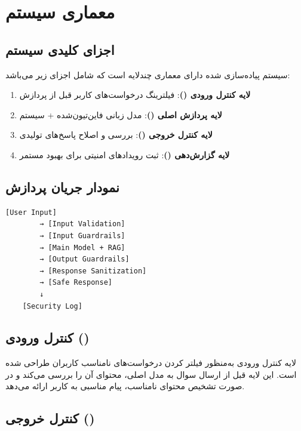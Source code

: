 \documentclass[11pt, a4paper, oneside]{book}
\begin{document}
	\section{معماری سیستم }

	\subsection{اجزای کلیدی سیستم}

	سیستم  پیاده‌سازی شده دارای معماری چندلایه است که شامل اجزای زیر می‌باشد:

	\begin{enumerate}
		\item \textbf{لایه کنترل ورودی ()}: فیلترینگ درخواست‌های کاربر قبل از پردازش
		\item \textbf{لایه پردازش اصلی ()}: مدل زبانی فاین‌تیون‌شده + سیستم 
		\item \textbf{لایه کنترل خروجی ()}: بررسی و اصلاح پاسخ‌های تولیدی
		\item \textbf{لایه گزارش‌دهی ()}: ثبت رویدادهای امنیتی برای بهبود مستمر
	\end{enumerate}

	\subsection{نمودار جریان پردازش}

	\begin{latin}
	\begin{lstlisting}[caption={\rl{معماری سیستم کنترل امنیتی}}]
	[User Input] 
		→ [Input Validation] 
		→ [Input Guardrails] 
		→ [Main Model + RAG] 
		→ [Output Guardrails] 
		→ [Response Sanitization]
		→ [Safe Response]
		↓
	[Security Log]
	\end{lstlisting}
	\end{latin}

	\subsection{کنترل ورودی ()}

	لایه کنترل ورودی به‌منظور فیلتر کردن درخواست‌های نامناسب کاربران طراحی شده است. این لایه قبل از ارسال سوال به مدل اصلی، محتوای آن را بررسی می‌کند و در صورت تشخیص محتوای نامناسب، پیام مناسبی به کاربر ارائه می‌دهد.

	\subsection{کنترل خروجی ()}
\end{document}
